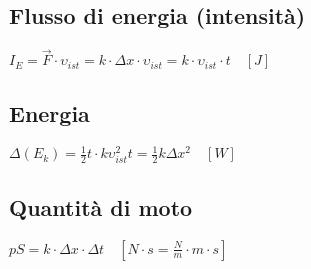 \documentclass[a4paper, 12pt]{article}
\newcommand{\spazio}{\hspace{0cm}}
\begin{document}
    \subsection*{Flusso di energia (intensità)}
    \spazio \(I_{E} = \vec{F} \cdot \upsilon_{ist} = k \cdot \Delta{x} \cdot \upsilon_{ist} = k \cdot \upsilon_{ist} \cdot t \quad [J]\)

    \subsection*{Energia}
    \spazio \(\Delta(E_{k}) = \frac{1}{2}t \cdot k\upsilon^2_{ist}t = \frac{1}{2}k\Delta{x^2} \quad [W]\)

    \subsection*{Quantità di moto}
    \spazio \(pS = k \cdot \Delta{x} \cdot \Delta{t} \quad [N \cdot s = \frac{N}{m} \cdot m \cdot s]\)
\end{document}
